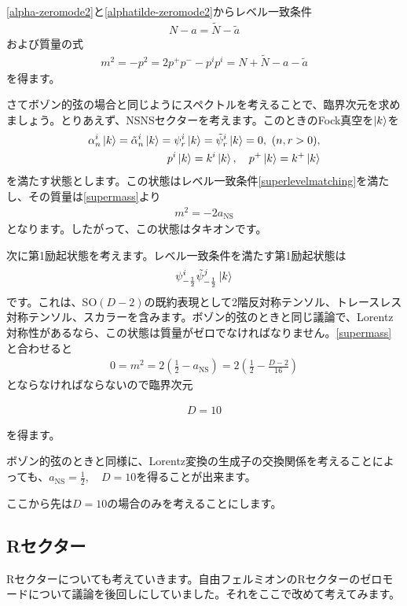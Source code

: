 \documentclass[report,paper=a4, fontsize=12pt, line_length=16cm, number_of_lines=34,dvipdfmx]{jlreq}
\newenvironment{important}{\begin{tcolorbox}[
  colback = white,
  colframe = red!35,
  boxrule = 2mm,
  fonttitle = \bfseries,
  after = \noindent] }{\end{tcolorbox}}
\numberwithin{equation}{chapter}
\numberwithin{equation}{section}
\newcommand{\alphat}{\tilde{\alpha}}
\newcommand{\Nt}{\widetilde{N}}
\newcommand{\at}{\tilde{a}}
\newcommand{\psit}{\tilde{\psi}}
\newcommand{\aNS}{a_{\mathrm{NS}}}
\begin{document}
\eqref{alpha-zeromode2}と\eqref{alphatilde-zeromode2}からレベル一致条件
\begin{align}
  N-a=\Nt-\at\label{superlevelmatching}
\end{align}
および質量の式
\begin{align}
  m^2=-p^2=2p^{+}p^{-}-p^{i}p^{i}=N+\Nt-a-\at\label{supermass}
\end{align}
を得ます。

さてボゾン的弦の場合と同じようにスペクトルを考えることで、臨界次元を求めましょう。とりあえず、NSNSセクターを考えます。このときのFock真空を$\ket{k}$を
\begin{align}
  \alpha_{n}^{i}\ket{k}=\alphat_{n}^{i}\ket{k}=\psi_{r}^{i}\ket{k}=\psit_{r}^{i}\ket{k}=0,\ (n,r>0),\nonumber\\
  p^{i}\ket{k}=k^i\ket{k},\quad p^{+}\ket{k}=k^{+}\ket{k}
\end{align}
を満たす状態とします。この状態はレベル一致条件\eqref{superlevelmatching}を満たし、その質量は\eqref{supermass}より
\begin{align}
  m^2=-2\aNS
\end{align}
となります。したがって、この状態はタキオンです。

次に第1励起状態を考えます。レベル一致条件を満たす第1励起状態は
\begin{align}
  \psi_{-\frac12}^{i}\psit_{-\frac12}^{j}\ket{k}
\end{align}
です。これは、SO$(D-2)$の既約表現として2階反対称テンソル、トレースレス対称テンソル、スカラーを含みます。ボゾン的弦のときと同じ議論で、Lorentz対称性があるなら、この状態は質量がゼロでなければなりません。\eqref{supermass}と合わせると
\begin{align}
  0=m^2=2(\frac12 -\aNS)=2(\frac12 -\frac{D-2}{16})
\end{align}
とならなければならないので臨界次元
\begin{important}
  \begin{align}
    D=10
  \end{align}
\end{important}
を得ます。

ボゾン的弦のときと同様に、Lorentz変換の生成子の交換関係を考えることによっても、$\aNS=\frac12,\quad D=10$を得ることが出来ます。

ここから先は$D=10$の場合のみを考えることにします。

\subsection{Rセクター}
Rセクターについても考えていきます。自由フェルミオンのRセクターのゼロモードについて議論を後回しにしていました。それをここで改めて考えてみます。
\end{document}
